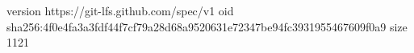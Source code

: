 version https://git-lfs.github.com/spec/v1
oid sha256:4f0e4fa3a3fdf44f7cf79a28d68a9520631e72347be94fc3931955467609f0a9
size 1121
